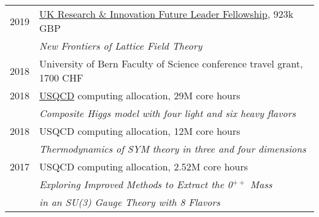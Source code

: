 \documentclass[10 pt]{article}
\begin{document}
\vspace{-12 pt} %
\begin{tabular}[t]{cl}
  2019 & \href{https://www.ukri.org/funding/funding-opportunities/future-leaders-fellowships/meet-our-future-leaders-fellows/david-schaich-university-of-liverpool/}{UK Research \& Innovation Future Leader Fellowship}, 923k GBP \\
       & \textit{New Frontiers of Lattice Field Theory}                                                                                                                                                                            \\[6 pt]
  2018 & University of Bern Faculty of Science conference travel grant, 1700 CHF                                                                                                                                                   \\[6 pt]
  2018 & \href{http://www.usqcd.org}{USQCD} computing allocation, 29M core hours                                                                                                                                                   \\ %
       & \textit{Composite Higgs model with four light and six heavy flavors}                                                                                                                                                      \\[6 pt]
  2018 & USQCD computing allocation, 12M core hours                                                                                                                                                                                \\ %
       & \textit{Thermodynamics of SYM theory in three and four dimensions}                                                                                                                                                        \\[6 pt]
  2017 & USQCD computing allocation, 2.52M core hours                                                                                                                                                                              \\ %
       & \textit{Exploring Improved Methods to Extract the 0$^{++}$ Mass} \\ & \textit{in an SU(3) Gauge Theory with 8 Flavors}                                                                                                    \\[6 pt]

\end{tabular}
\end{document}
